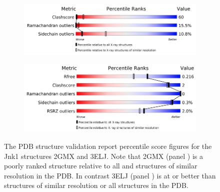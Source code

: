 \documentclass[9pt,bestpractices]{livecoms}
\begin{document}
\begin{landscape}
\begin{table}[ht]
\caption{
Evaluation of the quality of structural and activity experimental data of the proposed benchmark set.
%
The successive entries are the 
target name/identifier,
the used PDB ID and its quality evaluation in terms of
Iridium classification (Ir. Class.), 
Iridium score (Ir. Score) and 
diffraction-component precision index (DPI).
%
The structures listed in "Used structure" are those used in the initial version of this dataset, which is drawn in part from previous studies. However, alternate available structures may be superior. In these cases, we provide a PDB ID of a higher quality structure and 
its quality measures, in the "Alternate structure" fields.
%
Regarding activity data ("Ligand Information"), the number of ligands (count), the dynamic range ($\mathrm{max}(\Delta G)-\mathrm{min}(\Delta G)$) and the standard deviation of the $\Delta G$ ($\mathrm{std}(\Delta G)$) is given.
}
\label{tab:struct}

\end{table}
\end{landscape}

\begin{figure}
    \centering
    \begin{subfigure}[b]{0.48\textwidth}
        \includegraphics[width=\textwidth]{crystal/Jnk1_2gmx_pdb_report.png}
        \caption{}
        \label{fig:jnk1_pdb_report_2gmx}
    \end{subfigure}
    
    \begin{subfigure}[b]{0.48\textwidth}
        \includegraphics[width=\textwidth]{crystal/Jnk1_3elj_pdb_report.png}
        \caption{}
        \label{fig:jnk1_pdb_report_3elj}
    \end{subfigure}
    \caption{The PDB structure validation report percentile score figures for the Jnk1 structures 2GMX and 3ELJ.  Note that 2GMX (panel ) is a poorly ranked structure relative to all and structures of similar resolution in the PDB.  In contrast 3ELJ (panel ) is at or better than structures of similar resolution or all structures in the PDB.}
    \label{fig:jnk1_pdb_report}
\end{figure}
\end{document}
